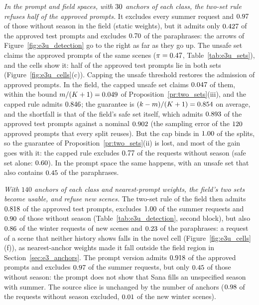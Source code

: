\documentclass{article}
\theoremstyle{plain}
\theoremstyle{remark}
\begin{document}
\emph{In the prompt and field spaces, with $30$ anchors of each class, the two-set rule refuses half of the approved prompts.} It
excludes every summer request and $0.97$ of those without season in the field (static weights), but it admits only $0.427$ of
the approved test prompts and excludes $0.70$ of the paraphrases: the arrows of Figure~\ref{fig:e3u_detection} go to the right as
far as they go up. The unsafe set claims the approved prompts of the same scenes ($\pi=0.47$, Table~\ref{tab:e3u_sets}), and the
cells show it: half of the approved test prompts lie in both sets (Figure~\ref{fig:e3u_cells}(c)). Capping the unsafe threshold restores the
admission of approved prompts. In the field, the capped unsafe set claims $0.047$ of them, within the bound
$m/(K+1)=0.049$ of Proposition~\ref{pr:two_sets}(iii), and the capped rule admits $0.846$; the guarantee is
$(k-m)/(K+1)=0.854$ on average, and the shortfall is that of the field's safe set itself, which admits $0.893$ of the
approved test prompts against a nominal $0.902$ (the sampling error of the $120$ approved prompts that every split reuses).
But the cap binds in $1.00$ of the splits, so the guarantee of Proposition~\ref{pr:two_sets}(ii) is lost, and most of the gain
goes with it: the capped rule excludes $0.77$ of the requests without season (safe set alone: $0.60$). In the prompt space the same happens, with
an unsafe set that also contains $0.45$ of the paraphrases.

\emph{With $140$ anchors of each class and nearest-prompt weights, the field's two sets become usable, and refuse new scenes.} The
two-set rule of the field then admits $0.818$ of the approved test prompts, excludes $1.00$ of the summer requests and
$0.90$ of those without season (Table~\ref{tab:e3u_detection}, second block), but also $0.86$ of the winter requests of
new scenes and $0.23$ of the paraphrases: a request of a scene that neither history shows falls in the novel cell
(Figure~\ref{fig:e3u_cells}(f)), as nearest-anchor weights made it fall outside the field region in Section~\ref{sec:e3_anchors}. The
prompt version admits $0.918$ of the approved prompts and excludes $0.97$ of the summer requests, but only $0.45$
of those without season: the prompt does not show that Sana fills an unspecified season with summer. The source slice is unchanged by the
number of anchors ($0.98$ of the requests without season excluded, $0.01$ of the new winter scenes).
\end{document}
